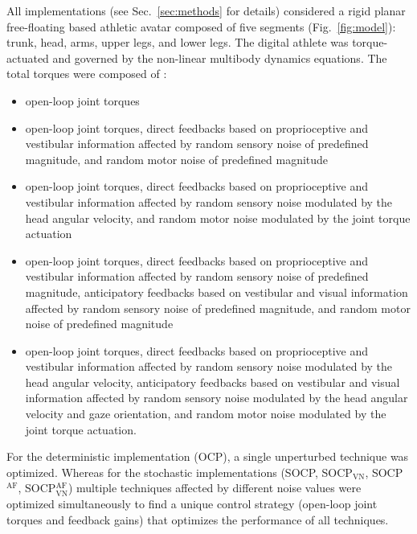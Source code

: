 \documentclass[10pt,letterpaper]{article}
\begin{document}
All implementations (see Sec.~\ref{sec:methods} for details) considered a rigid planar free-floating based athletic avatar composed of five segments (Fig.~\ref{fig:model}): trunk, head, arms, upper legs, and lower legs.
The digital athlete was torque-actuated and governed by the non-linear multibody dynamics equations.
The total torques were composed of :
\begin{itemize}
	\item[\textbf{OCP}] open-loop joint torques
	\item[\textbf{SOCP}] open-loop joint torques, direct feedbacks based on proprioceptive and vestibular information affected by random sensory noise of predefined magnitude, and random motor noise of predefined magnitude
	\item[\textbf{SOCP}$\mathbf{_{\text{VN}}}$] open-loop joint torques, direct feedbacks based on proprioceptive and vestibular information affected by random sensory noise modulated by the head angular velocity, and random motor noise modulated by the joint torque actuation
	\item[\textbf{SOCP}$\mathbf{^{\text{AF}}}$] open-loop joint torques, direct feedbacks based on proprioceptive and vestibular information affected by random sensory noise of predefined magnitude, anticipatory feedbacks based on vestibular and visual information affected by random sensory noise of predefined magnitude, and random motor noise of predefined magnitude
	\item[\textbf{SOCP}$\mathbf{_{\text{VN}}^{\text{AF}}}$] open-loop joint torques, direct feedbacks based on proprioceptive and vestibular information affected by random sensory noise modulated by the head angular velocity, anticipatory feedbacks based on vestibular and visual information affected by random sensory noise modulated by the head angular velocity and gaze orientation, and random motor noise modulated by the joint torque actuation.
\end{itemize}
For the deterministic implementation (OCP), a single unperturbed technique was optimized.
Whereas for the stochastic implementations (SOCP, SOCP$_{\text{VN}}$, SOCP$^{\text{AF}}$, SOCP$_{\text{VN}}^{\text{AF}}$) multiple techniques affected by different noise values were optimized simultaneously to find a unique control strategy (open-loop joint torques and feedback gains) that optimizes the performance of all techniques.
	
\end{document}
